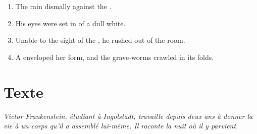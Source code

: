 \documentclass{fiche}
\begin{document}

\begin{anglais}
\begin{enumerate}[label=\arabic*.,itemsep=2mm,leftmargin=*]
  \item The rain  dismally against the .
  \item His eyes were set in  of a dull white.
  \item Unable to  the sight of the , he rushed out of the room.
  \item A  enveloped her form, and the grave-worms crawled in its folds.
\end{enumerate}
\end{anglais}

\newpage
\section{Texte}

\noindent\small\textit{Victor Frankenstein, étudiant à Ingolstadt, travaille depuis deux ans
à donner la vie à un corps qu'il a assemblé lui-même. Il raconte la nuit où il y
parvient.}\normalsize
\end{document}
